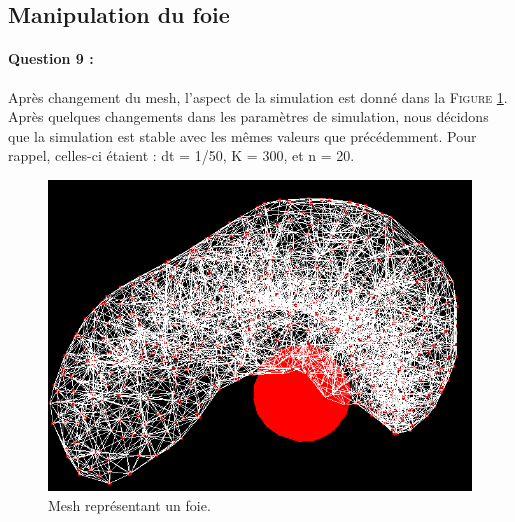 \documentclass[a4paper,12pt]{article}
\begin{document}
\subsection{Manipulation du foie}
\paragraph{Question 9 :} Après changement du mesh, l'aspect de la simulation est donné dans la \textsc{Figure} \ref{fig:liver}. Après quelques changements dans les paramètres de simulation, nous décidons que la simulation est stable avec les mêmes valeurs que précédemment. Pour rappel, celles-ci étaient : dt = 1/50, K = 300, et n = 20.
\begin{figure}[ht!]
  \centering
  \includegraphics[width=\textwidth]{images/foie.png}
  \caption{Mesh représentant un foie.}
  \label{fig:liver}
\end{figure}
\end{document}

